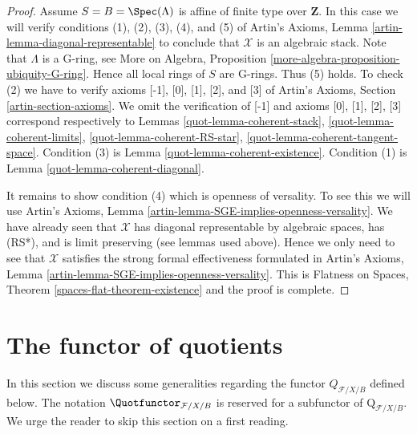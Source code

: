 \begin{proof}
\medskip\noindent
Assume $S = B = \Spec(\Lambda)$ is affine of finite type over $\mathbf{Z}$.
In this case we will verify conditions (1), (2), (3), (4), and (5) of
Artin's Axioms, Lemma \ref{artin-lemma-diagonal-representable}
to conclude that $\mathcal{X}$ is an algebraic stack.
Note that $\Lambda$ is a G-ring, see
More on Algebra, Proposition \ref{more-algebra-proposition-ubiquity-G-ring}.
Hence all local rings of $S$ are G-rings. Thus (5) holds.
To check (2) we have to verify axioms [-1], [0], [1], [2], and [3]
of Artin's Axioms, Section \ref{artin-section-axioms}.
We omit the verification of [-1] and axioms
[0], [1], [2], [3] correspond respectively to
Lemmas \ref{quot-lemma-coherent-stack},
\ref{quot-lemma-coherent-limits},
\ref{quot-lemma-coherent-RS-star},
\ref{quot-lemma-coherent-tangent-space}.
Condition (3) is Lemma \ref{quot-lemma-coherent-existence}.
Condition (1) is Lemma \ref{quot-lemma-coherent-diagonal}.

\medskip\noindent
It remains to show condition (4) which is openness of versality.
To see this we will use
Artin's Axioms, Lemma \ref{artin-lemma-SGE-implies-openness-versality}.
We have already seen that $\mathcal{X}$ has diagonal
representable by algebraic spaces, has (RS*), and is limit preserving
(see lemmas used above).
Hence we only need to see that $\mathcal{X}$ satisfies the strong
formal effectiveness formulated in
Artin's Axioms, Lemma \ref{artin-lemma-SGE-implies-openness-versality}.
This is Flatness on Spaces, Theorem \ref{spaces-flat-theorem-existence}
and the proof is complete.
\end{proof}

\section{The functor of quotients}
\label{quot-section-functor-quotients}
In this section we discuss some generalities regarding the functor
$Q_{\mathcal{F}/X/B}$ defined below.
The notation $\Quotfunctor_{\mathcal{F}/X/B}$ is reserved for a
subfunctor of $\text{Q}_{\mathcal{F}/X/B}$.
We urge the reader to skip this section on a first reading.

